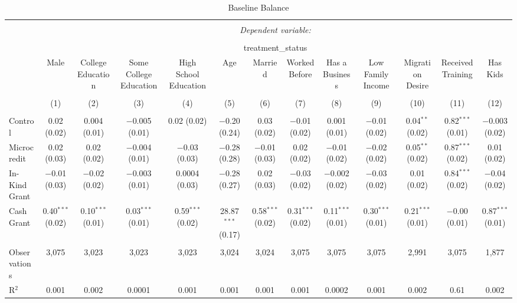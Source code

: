 
\begin{table}[!htbp] \centering 
  \caption{Baseline Balance} 
  \label{} 
\small 
\begin{tabular}{@{\extracolsep{5pt}}lcccccccccccc} 
\\[-1.8ex]\hline 
\hline \\[-1.8ex] 
 & \multicolumn{12}{c}{\textit{Dependent variable:}} \\ 
\cline{2-13} 
\\[-1.8ex] & \multicolumn{12}{c}{treatment\_status} \\ 
 & Male & College Education & Some College Education & High School Education & Age & Married & Worked Before & Has a Business & Low Family Income & Migration Desire & Received Training & Has Kids \\ 
\\[-1.8ex] & (1) & (2) & (3) & (4) & (5) & (6) & (7) & (8) & (9) & (10) & (11) & (12)\\ 
\hline \\[-1.8ex] 
 Control & 0.02 (0.02) & 0.004 (0.01) & $-$0.005 (0.01) & 0.02 (0.02) & $-$0.20 (0.24) & 0.03 (0.02) & $-$0.01 (0.02) & 0.001 (0.01) & $-$0.01 (0.02) & 0.04$^{**}$ (0.02) & 0.82$^{***}$ (0.01) & $-$0.003 (0.02) \\ 
  Microcredit & 0.02 (0.03) & 0.02 (0.02) & $-$0.004 (0.01) & $-$0.03 (0.03) & $-$0.28 (0.28) & $-$0.01 (0.03) & 0.02 (0.02) & $-$0.01 (0.02) & $-$0.02 (0.02) & 0.05$^{**}$ (0.02) & 0.87$^{***}$ (0.02) & 0.01 (0.02) \\ 
  In-Kind Grant & $-$0.01 (0.03) & $-$0.02 (0.02) & $-$0.003 (0.01) & 0.0004 (0.03) & $-$0.28 (0.27) & 0.02 (0.03) & $-$0.03 (0.02) & $-$0.002 (0.02) & $-$0.03 (0.02) & 0.01 (0.02) & 0.84$^{***}$ (0.02) & $-$0.04 (0.02) \\ 
  Cash Grant & 0.40$^{***}$ (0.02) & 0.10$^{***}$ (0.01) & 0.03$^{***}$ (0.01) & 0.59$^{***}$ (0.02) & 28.87$^{***}$ (0.17) & 0.58$^{***}$ (0.02) & 0.31$^{***}$ (0.02) & 0.11$^{***}$ (0.01) & 0.30$^{***}$ (0.01) & 0.21$^{***}$ (0.01) & $-$0.00 (0.01) & 0.87$^{***}$ (0.01) \\ 
 \hline \\[-1.8ex] 
Observations & 3,075 & 3,023 & 3,023 & 3,023 & 3,024 & 3,024 & 3,075 & 3,075 & 3,075 & 2,991 & 3,075 & 1,877 \\ 
R$^{2}$ & 0.001 & 0.002 & 0.0001 & 0.001 & 0.001 & 0.001 & 0.001 & 0.0002 & 0.001 & 0.002 & 0.61 & 0.002 \\ 

\end{tabular}
\end{table}
